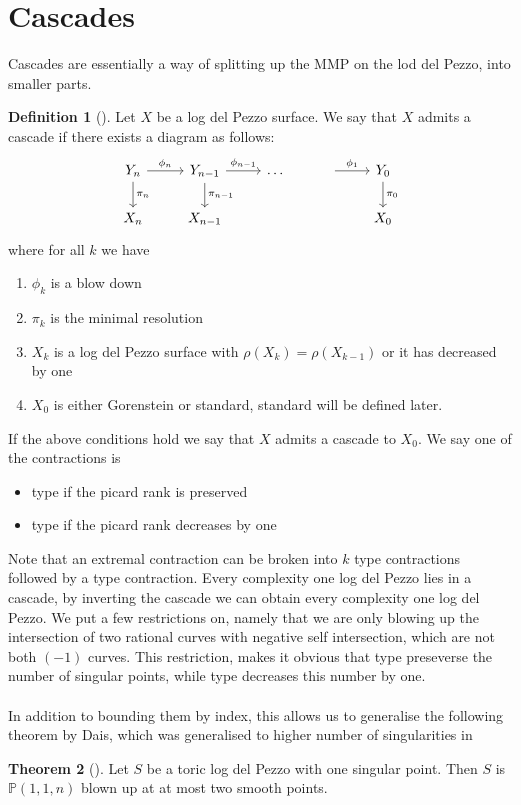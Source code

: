 \documentclass[11pt]{report}
\theoremstyle{definition}
\newtheorem{thm}{Theorem}[section]
\theoremstyle{definition}
\theoremstyle{definition}
\theoremstyle{definition}
\newtheorem{dfn}[thm]{Definition}
\theoremstyle{definition}
\theoremstyle{definition}
\theoremstyle{definition}
\newcommand{\Rom}[1]
    {\MakeUppercase{\romannumeral #1}}
\begin{document}
\section{Cascades}
Cascades are essentially a way of splitting up the MMP on the lod del Pezzo, into smaller parts. 
\begin{dfn}[\cite{H2}]
Let $X$ be a log del Pezzo surface. We say that $X$ admits a cascade if there exists a diagram as follows:
\[
\begin{tikzcd}
Y_n \arrow{d}{\pi_n}   \arrow{r}{\phi_n} & Y_{n-1} \arrow{d}{\pi_{n-1}} \arrow{r}{\phi_{n-1}} & \dots  & \arrow{r}{\phi_1} &Y_0 \arrow{d}{\pi_0}  \\
X_n & X_{n-1}& & & X_0
\end{tikzcd}
\]
where for all $k$ we have 
\begin{enumerate}
\item $\phi_k$ is a blow down
\item $\pi_k$ is the minimal resolution
\item $X_k$ is a log del Pezzo surface with $\rho (X_k) = \rho(X_{k-1})$ or it has decreased by one
\item $X_0$ is either Gorenstein or standard, standard will be defined later.
\end{enumerate}
\end{dfn}
If the above conditions hold we say that $X$ admits a cascade to $X_0$.  We say one of the contractions is 
\begin{itemize}
\item type \Rom{1} if the picard rank is preserved
\item type \Rom{2} if the picard rank decreases by one
\end{itemize}
Note that an extremal contraction can be broken into $k$ type \Rom{2} contractions followed by a type \Rom{1} contraction. Every complexity one log del Pezzo lies in a cascade, by inverting the cascade we can obtain every complexity one log del Pezzo. We put a few restrictions on, namely that we are only blowing up the intersection of two rational curves with negative self intersection, which are not both $(-1)$ curves. This restriction, makes it obvious that type \Rom{1} preseverse the number of singular points, while type \Rom{2} decreases this number by one.
\\
\\
In addition to bounding them by index, this allows us to generalise the following theorem by Dais, which was generalised to higher number of singularities in \cite{H2}
\\
\begin{thm}[\cite{Dais}]
Let $S$ be a toric log del Pezzo with one singular point. Then $S$ is $\mathbb{P}(1,1,n)$ blown up at at most two smooth points.
\end{thm}
\end{document}
